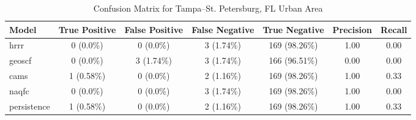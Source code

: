 \begin{table}[h!]
\centering
\begin{tabular}{lcccccc}
\hline
Model & True Positive & False Positive & False Negative & True Negative & Precision & Recall\\ \hline
hrrr & 0 (0.0\%) & 0 (0.0\%) & 3 (1.74\%) & 169 (98.26\%) & \cellcolor{green!25}1.00 & \cellcolor{red!25}0.00 \\ 
geoscf & 0 (0.0\%) & 3 (1.74\%) & 3 (1.74\%) & 166 (96.51\%) & \cellcolor{red!25}0.00 & \cellcolor{red!25}0.00 \\ 
cams & 1 (0.58\%) & 0 (0.0\%) & 2 (1.16\%) & 169 (98.26\%) & \cellcolor{green!25}1.00 & \cellcolor{green!25}0.33 \\ 
naqfc & 0 (0.0\%) & 0 (0.0\%) & 3 (1.74\%) & 169 (98.26\%) & \cellcolor{green!25}1.00 & \cellcolor{red!25}0.00 \\ 
persistence & 1 (0.58\%) & 0 (0.0\%) & 2 (1.16\%) & 169 (98.26\%) & 1.00 & 0.33 \\ 
\hline
\end{tabular}
\caption{Confusion Matrix for Tampa--St. Petersburg, FL Urban Area}
\end{table}

